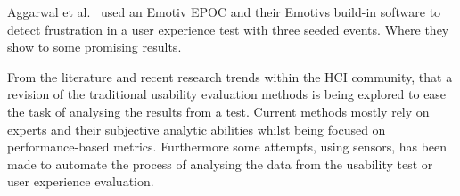 Aggarwal et al.~\cite{sensor_example} used an Emotiv EPOC and their Emotivs build-in software to detect frustration in a user experience test with three seeded events. Where they show to some promising results.

From the literature and recent research trends within the HCI community, that a revision of the traditional usability evaluation methods is being explored to ease the task of analysing the results from a test. Current methods mostly rely on experts and their subjective analytic abilities whilst being focused on performance-based metrics.
Furthermore some attempts, using sensors, has been made to automate the process of analysing the data from the usability test or user experience evaluation. 